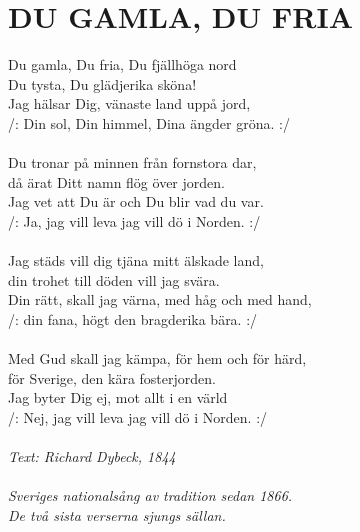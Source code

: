 \documentclass[a6paper,fontsize=10pt,twoside,openright]{scrbook}
\begin{document}
\section{DU GAMLA, DU FRIA}
Du gamla, Du fria, Du fjällhöga nord\\
Du tysta, Du glädjerika sköna!\\
Jag hälsar Dig, vänaste land uppå jord,\\
/: Din sol, Din himmel, Dina ängder gröna. :/\\
\\
Du tronar på minnen från fornstora dar,\\
då ärat Ditt namn flög över jorden.\\
Jag vet att Du är och Du blir vad du var.\\
/: Ja, jag vill leva jag vill dö i Norden. :/\\
\\
Jag städs vill dig tjäna mitt älskade land,\\
din trohet till döden vill jag svära.\\
Din rätt, skall jag värna, med håg och med hand,\\
/: din fana, högt den bragderika bära. :/\\
\\
Med Gud skall jag kämpa, för hem och för härd,\\
för Sverige, den kära fosterjorden.\\
Jag byter Dig ej, mot allt i en värld\\
/: Nej, jag vill leva jag vill dö i Norden. :/\\
\\
{\footnotesize\textit{
    Text: Richard Dybeck, 1844\\
    \\
    Sveriges nationalsång av tradition sedan 1866.\\
    De två sista verserna sjungs sällan.
}}
\clearpage
\end{document}
